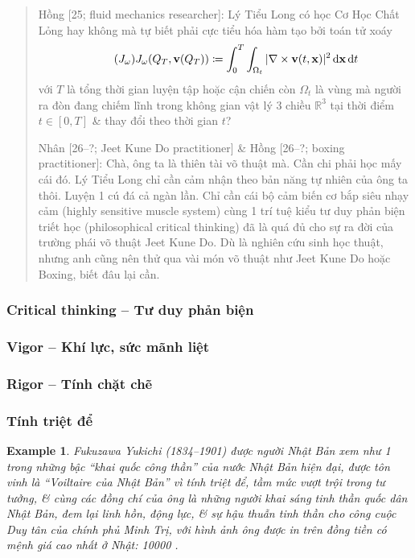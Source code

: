 \documentclass[12pt]{article}
\newtheorem{example}{Example}
\begin{document}
\begin{quote}
	{\sf Hồng [25; fluid mechanics researcher]}: {\sc Lý Tiểu Long} có học Cơ Học Chất Lỏng hay không mà tự biết phải cực tiểu hóa hàm tạo bởi toán tử xoáy
	\begin{equation}
		\label{curl cost functional}
		\tag{$J_\omega$}
		J_\omega(Q_T,{\bf v}(Q_T))\coloneqq\int_0^T\int_{\Omega_t} |\nabla\times{\bf v}(t,{\bf x})|^2\,{\rm d}{\bf x}\,{\rm d}t
	\end{equation}
	với $T$ là tổng thời gian luyện tập hoặc cận chiến còn $\Omega_t$ là vùng mà người ra đòn đang chiếm lĩnh trong không gian vật lý 3 chiều $\mathbb{R}^3$ tại thời điểm $t\in[0,T]$ \& thay đổi theo thời gian $t$?
	
	{\sf Nhân [26--?; Jeet Kune Do practitioner] \& Hồng [26--?; boxing practitioner]}: Chà, ông ta là thiên tài võ thuật mà. Cần chi phải học mấy cái đó. {\sc Lý Tiểu Long} chỉ cần cảm nhận theo bản năng tự nhiên của ông ta thôi. Luyện 1 cú đá cả ngàn lần. Chỉ cần cái bộ cảm biến cơ bắp siêu nhạy cảm (highly sensitive muscle system) cùng 1 trí tuệ kiểu tư duy phản biện triết học (philosophical critical thinking) đã là quá đủ cho sự ra đời của trường phái võ thuật Jeet Kune Do. Dù là nghiên cứu sinh học thuật, nhưng anh cũng nên thử qua vài món võ thuật như Jeet Kune Do hoặc Boxing, biết đâu lại cần.
\end{quote}

\subsubsection{Critical thinking -- Tư duy phản biện}

\subsubsection{Vigor -- Khí lực, sức mãnh liệt}

\subsubsection{Rigor -- Tính chặt chẽ}

\subsubsection{Tính triệt để}

\begin{example}
	{\sc Fukuzawa Yukichi} (1834--1901) được người Nhật Bản xem như 1 trong những bậc ``khai quốc công thần'' của nước Nhật Bản hiện đại, được tôn vinh là ``Voiltaire của Nhật Bản'' vì tính triệt để, tầm mức vượt trội trong tư tưởng, \& cùng các đồng chí của ông là những người khai sáng tinh thần quốc dân Nhật Bản, đem lại linh hồn, động lực, \& sự hậu thuẫn tinh thần cho công cuộc Duy tân của chính phủ Minh Trị, với hình ảnh ông được in trên đồng tiền có mệnh giá cao nhất ở Nhật: {\rm10000 \textyen}  {\rm\cite{Yukichi_encourage_learn,Yukichi_khuyen_hoc}}.
\end{example}
\end{document}
